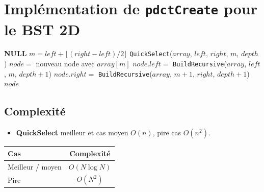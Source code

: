 \section{Implémentation de \texttt{pdctCreate} pour le BST 2D}

\begin{algorithm}[H]
\caption{\texttt{BuildRecursive}($array$, $left$, $right$, $depth$)}
\begin{algorithmic}[1]
 \Return \textbf{NULL} \EndIf
\State $m = left + \lfloor(right-left)/2\rfloor$
\State \texttt{QuickSelect}($array$, $left$, $right$, $m$, $depth$)
\State $node =$ nouveau node avec $array[m]$
\State $node.left =$ \texttt{BuildRecursive}($array$, $left$, $m$, $depth + 1$)
\State $node.right =$ \texttt{BuildRecursive}($array$, $m+1$, $right$, $depth + 1$)
\State \Return $node$
\end{algorithmic}
\end{algorithm}

\subsection*{Complexité}

\begin{itemize}
    \item \textbf{QuickSelect} meilleur et cas moyen $O(n)$, pire cas $O(n^2)$.
\end{itemize}

\begin{center}
\begin{tabular}{lc}
\toprule
Cas & Complexité \\
\midrule
Meilleur / moyen & $O(N \log N)$ \\
Pire & $O(N^2)$ \\
\bottomrule
\end{tabular}
\end{center}
